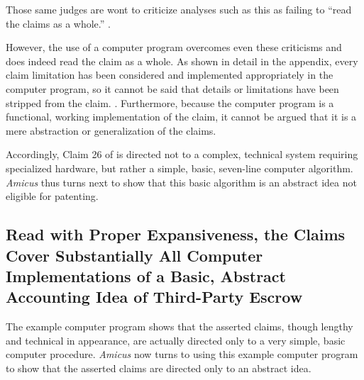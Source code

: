 \documentclass{scotus}
\def\numlines{seven\xspace}
\def\Amicus{\emph{Amicus}\xspace}
\begin{document}
Those same judges are wont to criticize analyses such as this as failing to
``read the claims as a whole.'' .

However, the use of a computer program overcomes even these criticisms and does
indeed read the claim as a whole. As shown in detail in the appendix, every
claim limitation has been considered and implemented appropriately in the
computer program, so it cannot be said that details or limitations have been
stripped from the claim. . Furthermore, because
the computer program is a functional, working implementation of the claim, it
cannot be argued that it is a mere abstraction or generalization of the claims.

Accordingly, Claim 26 of  is directed not to a complex, technical
system requiring specialized hardware, but rather a simple, basic,
\numlines-line computer algorithm. \Amicus thus turns next to show that this
basic algorithm is an abstract idea not eligible for patenting.

\subsection{Read with Proper Expansiveness, the Claims Cover Substantially All
Computer Implementations of a Basic, Abstract Accounting Idea of Third-Party
Escrow}

The example computer program shows that the asserted claims, though lengthy and
technical in appearance, are actually directed only to a very simple, basic
computer procedure. \Amicus now turns to using this example computer program to
show that the asserted claims are directed only to an abstract idea.
\end{document}
